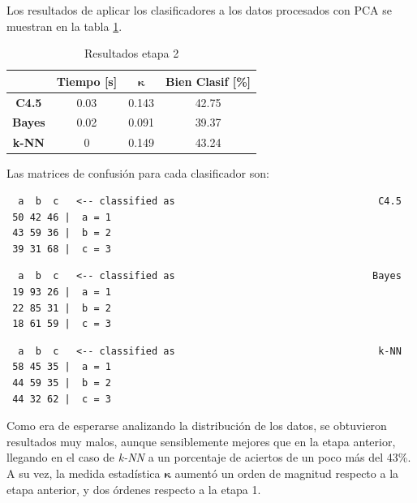 \documentclass[12pt,a4paper,titlepage]{report}
\newcommand{\bs}{\boldsymbol}
\begin{document}
Los resultados de aplicar los clasificadores a los datos procesados con PCA se muestran en la tabla \ref{tab:resultados_PCA}.
\begin{table}[H]
\centering
	\begin{tabular}{c|c|c|c|} 
	\cline{2-4}
	& \multicolumn{1}{c|}{\cellcolor[gray]{0.7} \textbf{Tiempo [s]}}  
	& \multicolumn{1}{c|}{\cellcolor[gray]{0.7} $\bs\kappa$}
	& \multicolumn{1}{c|}{\cellcolor[gray]{0.7} \textbf{Bien Clasif [\%]}} \\ \hline
	
	\multicolumn{1}{|c|}{\cellcolor[gray]{0.8} \textbf{C4.5}}   & 0.03 & 0.143 & \cellcolor[gray]{0.9}42.75  \\ \hline
	\multicolumn{1}{|c|}{\cellcolor[gray]{0.8} \textbf{Bayes}}  & 0.02 & 0.091 & \cellcolor[gray]{0.9}39.37 \\ \hline
	\multicolumn{1}{|c|}{\cellcolor[gray]{0.8} \textbf{k-NN}}   & 0    & 0.149 & \cellcolor[gray]{0.9}43.24 \\ \hline
	\end{tabular} 
	\caption{Resultados etapa 2}
	\label{tab:resultados_PCA}
\end{table}
Las matrices de confusión para cada clasificador son:
\vspace{-10pt}
\begin{lstlisting}
  a  b  c   <-- classified as									C4.5
 50 42 46 |  a = 1
 43 59 36 |  b = 2
 39 31 68 |  c = 3
\end{lstlisting}
\vspace{-1cm}
\begin{lstlisting}
  a  b  c   <-- classified as								   Bayes
 19 93 26 |  a = 1
 22 85 31 |  b = 2
 18 61 59 |  c = 3
\end{lstlisting}
\vspace{-1cm}
\begin{lstlisting}
  a  b  c   <-- classified as									k-NN
 58 45 35 |  a = 1
 44 59 35 |  b = 2
 44 32 62 |  c = 3
\end{lstlisting}

Como era de esperarse analizando la distribución de los datos, se obtuvieron resultados muy malos, aunque sensiblemente mejores que en la etapa anterior, llegando en el caso de \emph{k-NN} a un porcentaje de aciertos de un poco más del 43\%.\\

A su vez, la medida estadística $\bs\kappa$ aumentó un orden de magnitud respecto a la etapa anterior, y dos órdenes respecto a la etapa 1.
\end{document}
